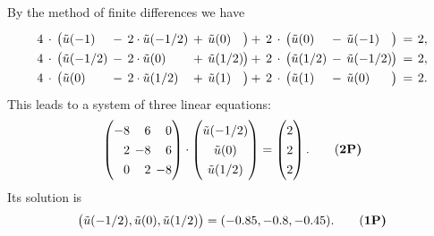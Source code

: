 \begin{loesung}
\begin{teilaufgaben}
\item
By the method of finite differences we have
\begin{equation*}
\renewcommand{\arraycolsep}{2pt}
\renewcommand{\arraystretch}{1.3}
\begin{array}{rclclclcrclclcl}
4&\cdot&\big(\tilde u(-1) &-& 2 \cdot \tilde u(-1/2) &+& \tilde u(0)
&\llap{$\big)$}\hspace{2pt}+&
2&\cdot&\big(\tilde u(0) &-& \tilde u(-1)
&\llap{$\big)$}\hspace*{2pt}=&
2,
\\
4&\cdot&\big(\tilde u(-1/2) &-& 2 \cdot \tilde u(0) &+& \tilde u(1/2)
&\llap{$\big)$}\hspace{2pt}+&
2&\cdot&\big(\tilde u(1/2) &-& \tilde u(-1/2)
&\llap{$\big)$}\hspace*{2pt}=&
2,
\\
4&\cdot&\big(\tilde u(0) &-& 2 \cdot \tilde u(1/2) &+& \tilde u(1)
&\llap{$\big)$}\hspace{2pt}+&
2&\cdot&\big(\tilde u(1) &-& \tilde u(0)
&\llap{$\big)$}\hspace*{2pt}=&
2.
\end{array}
\end{equation*}
This leads to a system of three linear equations:
\begin{equation}
\begin{pmatrix*}[r] -8 & 6 & 0 \\  2 & -8 & 6 \\  0 & 2 & -8 \end{pmatrix*}
\cdot
\begin{pmatrix} \tilde u(-1/2)  \\   \tilde u(0) \\ \tilde u(1/2) \end{pmatrix}
=
\begin{pmatrix*}[r] 2  \\  2 \\  2 \end{pmatrix*}.
\tag{\bf{2P}}
\end{equation}
Its solution is
\begin{equation}
\big(\tilde u(-1/2),  \tilde u(0), \tilde u(1/2)\big) = (-0.85 , -0.8, -0.45).
\tag{\bf{1P}}
\end{equation}


\end{teilaufgaben}
\end{loesung}
